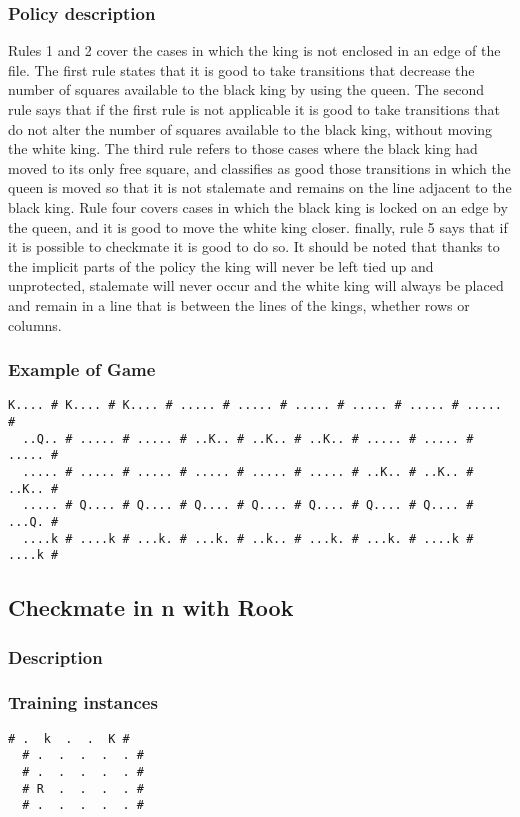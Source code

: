 \documentclass[a4paper]{article}
\begin{document}
\subsubsection{Policy description}
Rules 1 and 2 cover the cases in which the king is not enclosed in an edge of the file. The first rule states that it is good to take transitions that decrease the number of squares available to the black king by using the queen. The second rule says that if the first rule is not applicable it is good to take transitions that do not alter the number of squares available to the black king, without moving the white king. The third rule refers to those cases where the black king had moved to its only free square, and classifies as good those transitions in which the queen is moved so that it is not stalemate and remains on the line adjacent to the black king. Rule four covers cases in which the black king is locked on an edge by the queen, and it is good to move the white king closer. finally, rule 5 says that if it is possible to checkmate it is good to do so. It should be noted that thanks to the implicit parts of the policy the king will never be left tied up and unprotected, stalemate will never occur and the white king will always be placed and remain in a line that is between the lines of the kings, whether rows or columns.


\subsubsection{Example of Game}
\begin{Verbatim}[fontsize=\footnotesize]
  K.... # K.... # K.... # ..... # ..... # ..... # ..... # ..... # ..... #
  ..Q.. # ..... # ..... # ..K.. # ..K.. # ..K.. # ..... # ..... # ..... #
  ..... # ..... # ..... # ..... # ..... # ..... # ..K.. # ..K.. # ..K.. #
  ..... # Q.... # Q.... # Q.... # Q.... # Q.... # Q.... # Q.... # ...Q. #
  ....k # ....k # ...k. # ...k. # ..k.. # ...k. # ...k. # ....k # ....k #
\end{Verbatim}


\subsection{Checkmate in n with Rook}
\subsubsection{Description}


\subsubsection{Training instances}
\begin{Verbatim}[fontsize=\footnotesize]
  # .  k  .  .  K #
  # .  .  .  .  . #
  # .  .  .  .  . #
  # R  .  .  .  . #
  # .  .  .  .  . #
\end{Verbatim}
\end{document}
